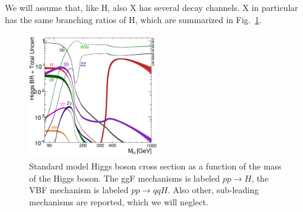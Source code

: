 \documentclass[a4paper,12pt]{article}
\begin{document}
 We will assume that, like H, also X has several decay channels. X in particular has the same branching ratios of H, which are summarized in Fig.~\ref{fig:br}.
\begin{figure}
 \centering 
 \includegraphics[width=0.5\textwidth]{images/Higgs_BR.png}
 \caption{Standard model Higgs boson cross section as a function of the mass of the Higgs boson. The ggF mechanisms is labeled $pp\rightarrow{}H$, the VBF mechanism is labeled $pp\rightarrow{}qqH$. Also other, sub-leading mechanisms are reported, 
 which we will neglect.\label{fig:br}}
\end{figure}
\end{document}
